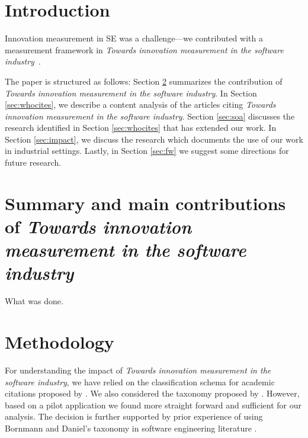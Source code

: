 \documentclass[sigplan]{acmart}
\newcommand{\theArticle}{\textit{Towards innovation measurement in the software industry}}
\begin{document}



\maketitle


\section{Introduction}\label{sec:intro}
Innovation measurement in SE was a challenge---we contributed with a measurement framework in \theArticle~\cite{EdisonAT13}. 

The paper is structured as follows: Section \ref{sec:sumpaper} summarizes the contribution of \theArticle. In Section \ref{sec:whocites}, we describe a content analysis of the articles citing \theArticle. Section \ref{sec:soa} discusses the research identified in Section \ref{sec:whocites} that has extended our work. In Section \ref{sec:impact}, we discuss the research which documents the use of our work in industrial settings. Lastly, in Section \ref{sec:fw} we suggest some directions for future research.

\section{Summary and main contributions of \theArticle}\label{sec:sumpaper}
What was done.

\section{Methodology}
For understanding the impact of \theArticle, we have relied on the classification schema for academic citations proposed by \citet{teufel2006annotation}. We also considered the taxonomy proposed by \citet{bornmann2008citation}. However, based on a pilot application we found \citet{teufel2006annotation} more straight forward and sufficient for our analysis. The decision is further supported by prior experience of using Bornmann and Daniel's taxonomy in software engineering literature \cite{poulding2015using}.
\end{document}
